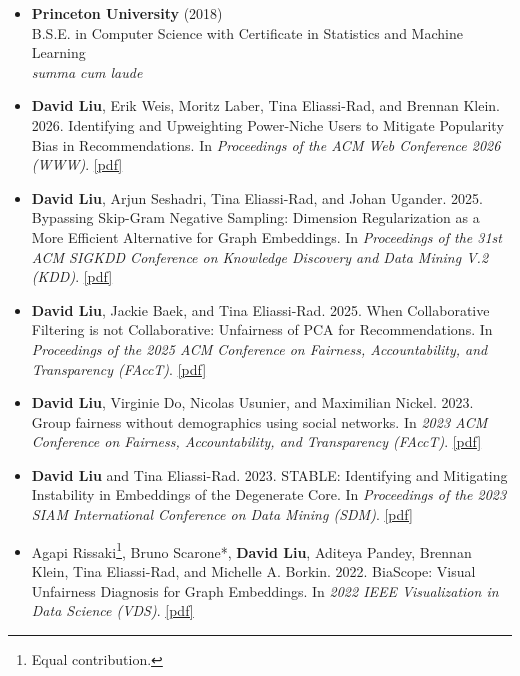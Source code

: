 \documentclass[margin]{res}
\begin{document}
\begin{resume}
\begin{itemize}
\item[]
\textbf{Princeton University} (2018)\\
B.S.E. in Computer Science with Certificate in Statistics and Machine Learning\\
\emph{summa cum laude}
\end{itemize}

\begin{itemize}
\section{Conference\\Papers}
\setlength{\itemsep}{14pt}
\setlength{\parsep}{0pt}
\item[]
\textbf{David Liu}, Erik Weis, Moritz Laber, Tina Eliassi-Rad, and Brennan Klein. 2026. Identifying and Upweighting Power-Niche Users to Mitigate Popularity Bias in Recommendations. In \textit{Proceedings of the ACM Web Conference 2026 (WWW)}. \href{https://arxiv.org/abs/2509.17265}{[pdf]}
\item[]
\textbf{David Liu}, Arjun Seshadri, Tina Eliassi-Rad, and Johan Ugander. 2025. Bypassing Skip-Gram Negative Sampling: Dimension Regularization as a More Efficient Alternative for Graph Embeddings. In \textit{Proceedings of the 31st ACM SIGKDD Conference on Knowledge Discovery and Data Mining V.2 (KDD)}. \href{https://arxiv.org/abs/2405.00172}{[pdf]}
\item[]
\textbf{David Liu}, Jackie Baek, and Tina Eliassi-Rad. 2025. When Collaborative Filtering is not Collaborative: Unfairness of PCA for Recommendations. In \textit{Proceedings of the 2025 ACM Conference on Fairness, Accountability, and Transparency (FAccT)}. \href{https://arxiv.org/abs/2310.09687}{[pdf]}
\item[]
\textbf{David Liu}, Virginie Do, Nicolas Usunier, and Maximilian Nickel. 2023. Group fairness without demographics using social networks. In \textit{2023 ACM Conference on Fairness, Accountability, and Transparency (FAccT)}. \href{https://arxiv.org/abs/2305.11361}{[pdf]}
\item[]
\textbf{David Liu} and Tina Eliassi-Rad. 2023. STABLE: Identifying and Mitigating Instability in Embeddings of the Degenerate Core. In \textit{Proceedings of the 2023 SIAM International Conference on Data Mining (SDM)}. \href{https://epubs.siam.org/doi/10.1137/1.9781611977653.ch46}{[pdf]}
\item[]
Agapi Rissaki{\renewcommand{\thefootnote}{*}\footnote{Equal contribution.}}, Bruno Scarone*, \textbf{David Liu}, Aditeya Pandey, Brennan Klein, Tina Eliassi-Rad, and Michelle A. Borkin. 2022. BiaScope: Visual Unfairness Diagnosis for Graph Embeddings. In \textit{2022 IEEE Visualization in Data Science (VDS)}. \href{https://ieeexplore.ieee.org/document/9980579}{[pdf]}

\end{itemize}
\end{resume}
\end{document}
